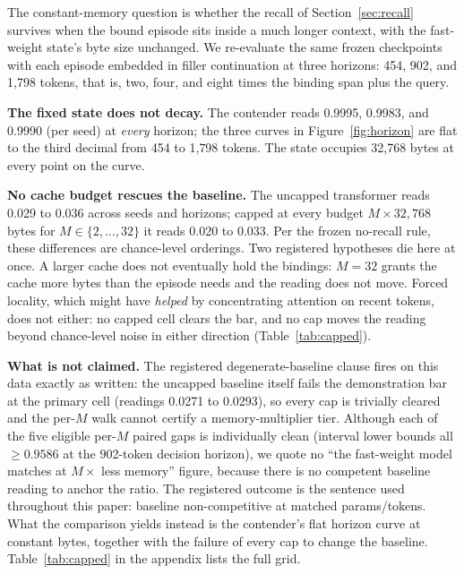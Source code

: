 \documentclass{article}
\begin{document}
The constant-memory question is whether the recall of
Section~\ref{sec:recall} survives when the bound episode sits inside a
much longer context, with the fast-weight state's byte size unchanged. We
re-evaluate the same frozen checkpoints with each episode embedded in
filler continuation at three horizons: 454, 902, and 1{,}798 tokens, that
is, two, four, and eight times the binding span plus the
query. %

\textbf{The fixed state does not decay.} The contender reads 0.9995,
0.9983, and 0.9990 (per seed) at \emph{every} horizon; the three curves in
Figure~\ref{fig:horizon} are flat to the third decimal from 454 to 1{,}798
tokens. %
The state occupies 32{,}768 bytes at every point on the
curve. %

\textbf{No cache budget rescues the baseline.} The uncapped transformer
reads 0.029 to 0.036 across seeds and horizons; %
capped at every budget $M \times 32{,}768$ bytes for
$M \in \{2, \ldots, 32\}$ it reads 0.020 to
0.033. %
Per the frozen no-recall rule, these differences are chance-level
orderings. Two registered hypotheses die here at once. A larger cache
does not eventually hold the bindings: $M{=}32$ grants the cache more
bytes than the episode needs and the reading does not move. Forced
locality, which might have \emph{helped} by concentrating attention on
recent tokens, does not either: no capped cell clears the bar, and no cap
moves the reading beyond chance-level noise in either direction
(Table~\ref{tab:capped}).

\textbf{What is not claimed.} The registered degenerate-baseline clause
fires on this data exactly as written: the uncapped baseline itself fails
the demonstration bar at the primary cell (readings 0.0271 to 0.0293),
so every cap is trivially cleared and the per-$M$ walk cannot certify a
memory-multiplier tier. Although each of the five eligible per-$M$ paired
gaps is individually clean (interval lower bounds all $\geq 0.9586$ at the
902-token decision horizon), %
we quote no ``the fast-weight model matches at $M\times$ less memory''
figure, because there is no competent baseline reading to anchor the
ratio. The registered outcome is the sentence used throughout this paper:
baseline non-competitive at matched params/tokens. What the comparison
yields instead is the contender's flat horizon curve at constant bytes,
together with the failure of every cap to change the baseline.
Table~\ref{tab:capped} in the appendix lists the full grid.
\end{document}
